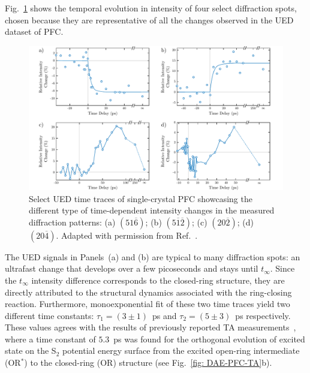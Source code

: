 Fig.~\ref{fig: DAE-PFC-UEDtraces} shows the temporal evolution in intensity of four select
diffraction spots, chosen because they are representative of all the changes observed
in the UED dataset of PFC.
%
\begin{figure}[ht!]
  \centering
  \includegraphics[width = \textwidth]{Figures/fig_DAE_PFC_UEDtraces.pdf}
  \caption[Select UED time traces of single-crystal PFC.]{
    Select UED time traces of single-crystal PFC showcasing
    the different type of time-dependent intensity changes
    in the measured diffraction patterns:
    (a) $(5 1 \overline{6})$;
    (b) $(5 \overline{1} \overline{2})$;
    (c) $(2 0 \overline{2})$;
    (d) $(2 0 \overline{4})$.
    Adapted with permission from Ref.~\cite{Jean-Ruel2013}.
  }
  \label{fig: DAE-PFC-UEDtraces}
\end{figure}

The UED signals in Panels~(a) and (b) are typical to many diffraction spots:
an ultrafast change that develops over a few picoseconds and stays until $t_\infty$.
Since the $t_\infty$ intensity difference corresponds to the closed-ring structure,
they are directly attributed to the structural dynamics associated with
the ring-closing reaction.
Furthermore, monoexponential fit of these two time traces yield
two different time constants: $\tau_1 = (3 \pm 1)$~ps and $\tau_2 = (5 \pm 3)$~ps respectively.
These values agrees with the results of previously reported TA measurements~\cite{Jean-Ruel2011},
where a time constant of $5.3$~ps was found for the orthogonal evolution of
excited state on the S$_2$ potential energy surface from the excited open-ring intermediate (OR$^*$)
to the closed-ring (OR) structure (see Fig.~\ref{fig: DAE-PFC-TA}b).

